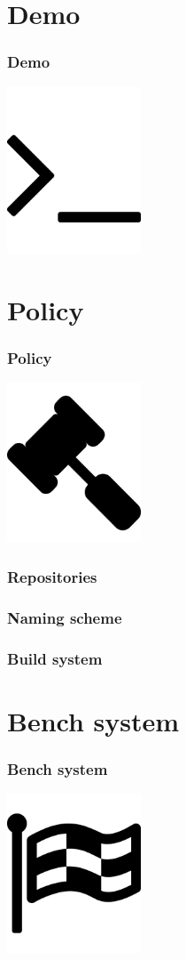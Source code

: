 \documentclass{beamer}
\begin{document}
  \section{Demo}
  \begin{frame}
    \frametitle{Demo}
    \begin{center}
      \includegraphics[width=4cm]{images/demo}
    \end{center}
  \end{frame}

  \section{Policy}
  \begin{frame}
    \frametitle{Policy}
    \begin{center}
      \includegraphics[width=4cm]{images/policy}
    \end{center}
  \end{frame}
  \begin{frame}
    \frametitle{Repositories}
  \end{frame}
  \begin{frame}
    \frametitle{Naming scheme}
  \end{frame}
  \begin{frame}
    \frametitle{Build system}
  \end{frame}

  \section{Bench system}
  \begin{frame}
    \frametitle{Bench system}
    \begin{center}
      \includegraphics[width=4cm]{images/bench}
    \end{center}
  \end{frame}
\end{document}
